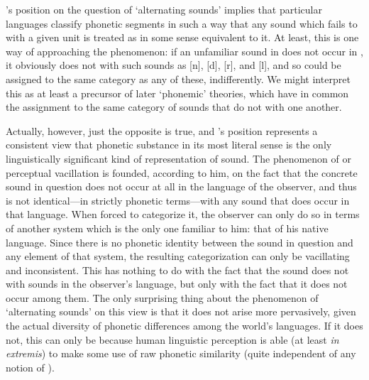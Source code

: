 {\Boas}'s position on the question of `alternating sounds' implies that
particular languages classify phonetic segments in such a way that any
sound which fails to  with a given unit is treated as in some
sense equivalent to it. At least, this is one way of approaching the
phenomenon: if an unfamiliar sound in  does not occur in
, it obviously does not  with such  sounds as
[n], [d], [r], and [l], and so could be assigned to the same category
as any of these, indifferently. We might interpret this as at least a
precursor of later `phonemic' theories, which have in common the
assignment to the same category of sounds that do not  with
one another.

Actually, however, just the opposite is true, and {\Boas}'s position
represents a consistent view that phonetic substance in its most
literal sense is the only linguistically significant kind of
representation of sound. The phenomenon of  or perceptual
vacillation is founded, according to him, on the fact that the
concrete sound in question does not occur at all in the language of
the observer, and thus is not identical—in strictly phonetic
terms—with any sound that does occur in that language. When forced to
categorize it, the observer can only do so in terms of another system
which is the only one familiar to him: that of his native
language. Since there is no phonetic identity between the sound in
question and any element of that system, the resulting categorization
can only be vacillating and inconsistent. This has nothing to do with
the fact that the sound does not  with sounds in the
observer's language, but only with the fact that it does not occur
among them. The only surprising thing about the phenomenon of
`alternating sounds' on this view is that it does not arise more
pervasively, given the actual diversity of phonetic differences among
the world's languages. If it does not, this can only be because human
linguistic perception is able (at least \emph{in extremis}) to make
some use of raw phonetic similarity (quite independent of any notion
of ).

